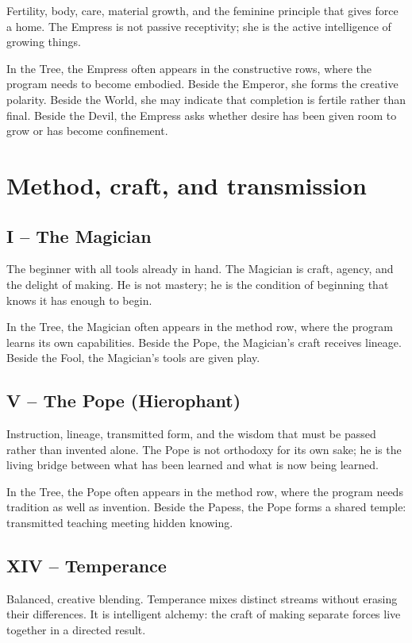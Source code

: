 Fertility, body, care, material growth, and the feminine principle that gives
force a home. The Empress is not passive receptivity; she is the active
intelligence of growing things.

In the Tree, the Empress often appears in the constructive rows, where the
program needs to become embodied. Beside the Emperor, she forms the creative
polarity. Beside the World, she may indicate that completion is fertile rather
than final. Beside the Devil, the Empress asks whether desire has been given
room to grow or has become confinement.

\section{Method, craft, and transmission}

\subsection{I -- The Magician}

The beginner with all tools already in hand. The Magician is craft, agency, and
the delight of making. He is not mastery; he is the condition of beginning that
knows it has enough to begin.

In the Tree, the Magician often appears in the method row, where the program
learns its own capabilities. Beside the Pope, the Magician's craft receives
lineage. Beside the Fool, the Magician's tools are given play.

\subsection{V -- The Pope (Hierophant)}

Instruction, lineage, transmitted form, and the wisdom that must be passed rather
than invented alone. The Pope is not orthodoxy for its own sake; he is the
living bridge between what has been learned and what is now being learned.

In the Tree, the Pope often appears in the method row, where the program needs
tradition as well as invention. Beside the Papess, the Pope forms a shared
temple: transmitted teaching meeting hidden knowing.

\subsection{XIV -- Temperance}

Balanced, creative blending. Temperance mixes distinct streams without erasing
their differences. It is intelligent alchemy: the craft of making separate forces
live together in a directed result.

